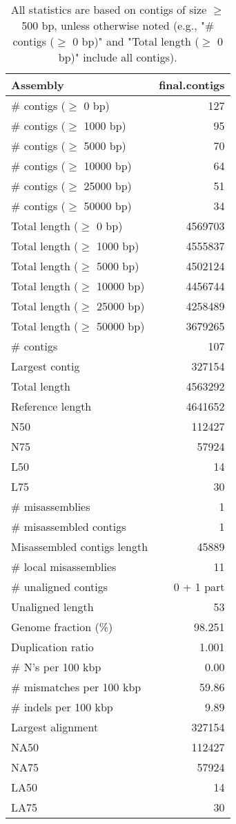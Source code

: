 \documentclass[12pt,a4paper]{article}
\begin{document}
\begin{table}[ht]
\begin{center}
\caption{All statistics are based on contigs of size $\geq$ 500 bp, unless otherwise noted (e.g., "\# contigs ($\geq$ 0 bp)" and "Total length ($\geq$ 0 bp)" include all contigs).}
\begin{tabular}{|l*{1}{|r}|}
\hline
Assembly & final.contigs \\ \hline
\# contigs ($\geq$ 0 bp) & 127 \\ \hline
\# contigs ($\geq$ 1000 bp) & 95 \\ \hline
\# contigs ($\geq$ 5000 bp) & 70 \\ \hline
\# contigs ($\geq$ 10000 bp) & 64 \\ \hline
\# contigs ($\geq$ 25000 bp) & 51 \\ \hline
\# contigs ($\geq$ 50000 bp) & 34 \\ \hline
Total length ($\geq$ 0 bp) & 4569703 \\ \hline
Total length ($\geq$ 1000 bp) & 4555837 \\ \hline
Total length ($\geq$ 5000 bp) & 4502124 \\ \hline
Total length ($\geq$ 10000 bp) & 4456744 \\ \hline
Total length ($\geq$ 25000 bp) & 4258489 \\ \hline
Total length ($\geq$ 50000 bp) & 3679265 \\ \hline
\# contigs & 107 \\ \hline
Largest contig & 327154 \\ \hline
Total length & 4563292 \\ \hline
Reference length & 4641652 \\ \hline
N50 & 112427 \\ \hline
N75 & 57924 \\ \hline
L50 & 14 \\ \hline
L75 & 30 \\ \hline
\# misassemblies & 1 \\ \hline
\# misassembled contigs & 1 \\ \hline
Misassembled contigs length & 45889 \\ \hline
\# local misassemblies & 11 \\ \hline
\# unaligned contigs & 0 + 1 part \\ \hline
Unaligned length & 53 \\ \hline
Genome fraction (\%) & 98.251 \\ \hline
Duplication ratio & 1.001 \\ \hline
\# N's per 100 kbp & 0.00 \\ \hline
\# mismatches per 100 kbp & 59.86 \\ \hline
\# indels per 100 kbp & 9.89 \\ \hline
Largest alignment & 327154 \\ \hline
NA50 & 112427 \\ \hline
NA75 & 57924 \\ \hline
LA50 & 14 \\ \hline
LA75 & 30 \\ \hline
\end{tabular}
\end{center}
\end{table}
\end{document}
